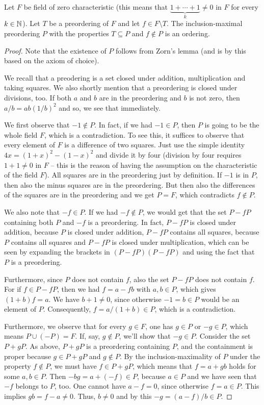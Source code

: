\begin{lemma}[Serre 1947]
	\label{lem:Serre}
	Let $F$ be field of zero characteristic (this means that $\underbrace{1+ \cdots + 1}_k \ne 0$ in $F$ for every $k \in \mathbb{N}$). Let $T$ be a preordering of $F$ and let $f \in F \setminus T$. The inclusion-maximal preordering $P$ with the properties $T \subseteq P$ and $f \not\in P$ is an ordering. 
\end{lemma}
\begin{proof}
	Note that the existence of $P$ follows from Zorn's lemma (and is by this based on the axiom of choice).
	
	We recall that a preodering is a set closed under addition, multiplication and taking squares. We also shortly mention that a preordering is closed under divisions, too. If both $a$ and $b$ are in the preordering and $b$ is not zero, then $a/b = a b (1/b)^2$ and so, we see that immediately.
	
	We first observe that $-1 \not\in P$. In fact, if we had $-1 \in P$, then $P$ is going to be the whole field $F$, which is a contradiction. To see this, it suffices to observe that every element of $F$ is a difference of two squares. Just use the simple identity $ 4 x = (1+x)^2 - (1-x)^2$ and divide it by four (division by four requires $1+1 \ne 0$ in $F$ -- this is the reason of having the assumption on the characteristic of the field $F$). All squares are in the preordering just by definition. If $-1$ is in $P$, then also the minus squares are in the preordering. But then also the differences of the squares are in the preordering and we get $P=F$, which contradicts $f \not\in P$. 
	
	
	We also note that $-f \in P$. If we had $-f \not \in P$, we would get that the set $P - f P$ containing both $P$ and $-f$ is a preordering. In fact, $P - f P$ is closed under addition, because $P$ is closed under addition, $P-f P$ contains all squares, because $P$ contains all squares and $P- f P$ is closed under multiplication, which can be seen by expanding the brackets in $(P -f P)(P - fP)$ and using the fact that $P$ is a preordering. 
	
	Furthermore, since $P$ does not contain $f$, also the set $P - fP$ does not contain $f$. For if $f \in P - fP$, then we had $f = a - f b$ with $a, b \in P$, which gives $(1+b) f = a$. We have $b+1 \ne 0$, since otherwise $-1 = b \in P$ would be an element of $P$. Consequently, $ f= a / (1+b) \in P$, which is a contradiction.
	
	Furthermore, we observe that for every $g \in F$, one has $g \in P$ or $-g \in P$, which means $P \cup (-P) = F$. 
	If, say, $g \not \in P$, we'll show that $-g \in P$. Consider the set $P + g P$. As above, $P + g P$ is a preordering containing $P$, and the containment is proper because $g \in P+ gP$ and $g \not\in P$. By the inclusion-maximality of $P$ under the property $f \not\in P$, we must have $f \in P + gP$, which means that $f = a + g b$ holds for some $a,b \in P$. Then $ - b g = a + (-f) \in P$, because $a \in P$ and we have seen that $-f$ belongs to $P$, too. One cannot have $a - f= 0 $, since otherwise $f = a \in P$. This implies $g b = f -a  \ne 0$. Thus, $b \ne 0$ and by this $-g = (a-f) / b \in P$. 
	

\end{proof}

